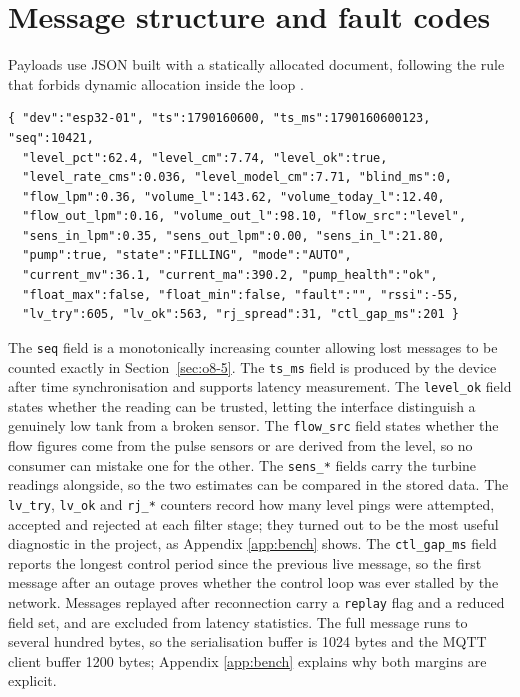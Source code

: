 \section{Message structure and fault codes}
\label{sec:o4-2}

Payloads use JSON built with a statically allocated document, following the rule that forbids dynamic allocation inside the loop \cite{slide05, arduinojson}.

\begin{lstlisting}[caption={Telemetry message payload, abridged.},label={lst:telemetry}]
{ "dev":"esp32-01", "ts":1790160600, "ts_ms":1790160600123, "seq":10421,
  "level_pct":62.4, "level_cm":7.74, "level_ok":true,
  "level_rate_cms":0.036, "level_model_cm":7.71, "blind_ms":0,
  "flow_lpm":0.36, "volume_l":143.62, "volume_today_l":12.40,
  "flow_out_lpm":0.16, "volume_out_l":98.10, "flow_src":"level",
  "sens_in_lpm":0.35, "sens_out_lpm":0.00, "sens_in_l":21.80,
  "pump":true, "state":"FILLING", "mode":"AUTO",
  "current_mv":36.1, "current_ma":390.2, "pump_health":"ok",
  "float_max":false, "float_min":false, "fault":"", "rssi":-55,
  "lv_try":605, "lv_ok":563, "rj_spread":31, "ctl_gap_ms":201 }
\end{lstlisting}

The \texttt{seq} field is a monotonically increasing counter allowing lost messages to be counted exactly in Section~\ref{sec:o8-5}. The \texttt{ts\_ms} field is produced by the device after time synchronisation and supports latency measurement. The \texttt{level\_ok} field states whether the reading can be trusted, letting the interface distinguish a genuinely low tank from a broken sensor. The \texttt{flow\_src} field states whether the flow figures come from the pulse sensors or are derived from the level, so no consumer can mistake one for the other. The \texttt{sens\_*} fields carry the turbine readings alongside, so the two estimates can be compared in the stored data. The \texttt{lv\_try}, \texttt{lv\_ok} and \texttt{rj\_*} counters record how many level pings were attempted, accepted and rejected at each filter stage; they turned out to be the most useful diagnostic in the project, as Appendix \ref{app:bench} shows. The \texttt{ctl\_gap\_ms} field reports the longest control period since the previous live message, so the first message after an outage proves whether the control loop was ever stalled by the network. Messages replayed after reconnection carry a \texttt{replay} flag and a reduced field set, and are excluded from latency statistics. The full message runs to several hundred bytes, so the serialisation buffer is 1024 bytes and the MQTT client buffer 1200 bytes; Appendix \ref{app:bench} explains why both margins are explicit.

